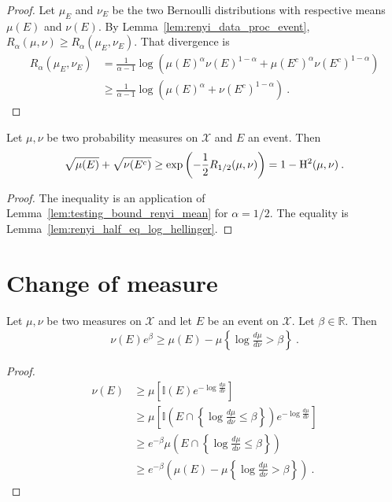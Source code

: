 \begin{proof}
Let $\mu_E$ and $\nu_E$ be the two Bernoulli distributions with respective means $\mu(E)$ and $\nu(E)$.
By Lemma~\ref{lem:renyi_data_proc_event}, $R_\alpha(\mu, \nu) \ge R_\alpha(\mu_E, \nu_E)$. That divergence is
\begin{align*}
R_\alpha(\mu_E, \nu_E)
&= \frac{1}{\alpha - 1}\log \left(\mu(E)^\alpha \nu(E)^{1 - \alpha}
  + \mu(E^c)^\alpha \nu(E^c)^{1 - \alpha}\right)
\\
&\ge \frac{1}{\alpha - 1}\log \left(\mu(E)^\alpha + \nu(E^c)^{1 - \alpha}\right)
\: .
\end{align*}
\end{proof}

\begin{corollary}
  \label{cor:testing_bound_hellinger}
  Let $\mu, \nu$ be two probability measures on $\mathcal X$ and $E$ an event. Then
  \begin{align*}
  \sqrt{\mu(E)} + \sqrt{\nu(E^c)}
  \ge \exp\left(-\frac{1}{2} R_{1/2}(\mu, \nu)\right)
  = 1 - \operatorname{H^2}(\mu, \nu)
  \: .
  \end{align*}
\end{corollary}

\begin{proof}
The inequality is an application of Lemma~\ref{lem:testing_bound_renyi_mean} for $\alpha = 1/2$. The equality is Lemma~\ref{lem:renyi_half_eq_log_hellinger}.
\end{proof}

\section{Change of measure}

\begin{lemma}
  \label{lem:llr_change_measure}
  Let $\mu, \nu$ be two measures on $\mathcal X$ and let $E$ be an event on $\mathcal X$. Let $\beta \in \mathbb{R}$. Then
  \begin{align*}
  \nu(E) e^{\beta} \ge \mu(E) - \mu\left\{ \log\frac{d \mu}{d \nu} > \beta \right\} \: .
  \end{align*}
\end{lemma}

\begin{proof}
\begin{align*}
\nu(E)
&\ge \mu\left[\mathbb{I}(E) e^{- \log\frac{d \mu}{d \nu} }\right]
\\
&\ge \mu\left[\mathbb{I}\left(E \cap \left\{\log\frac{d \mu}{d \nu} \le \beta\right\}\right) e^{- \log\frac{d \mu}{d \nu} }\right]
\\
&\ge e^{- \beta}\mu\left(E \cap \left\{\log\frac{d \mu}{d \nu} \le \beta\right\}\right)
\\
&\ge e^{- \beta}\left( \mu(E) - \mu\left\{ \log\frac{d \mu}{d \nu} > \beta \right\} \right)
\: .
\end{align*}
\end{proof}

